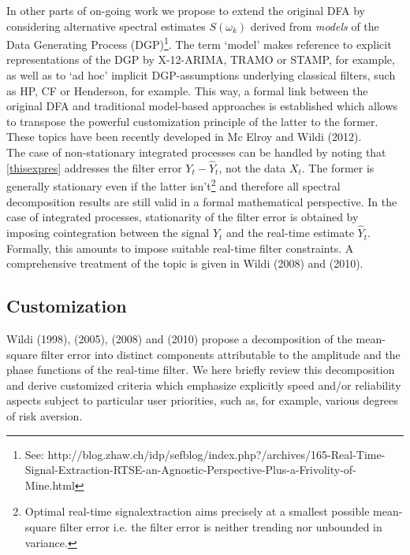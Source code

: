 \documentclass[11pt]{article}
\begin{document}
In other parts of on-going work we propose to extend the original DFA by considering alternative spectral estimates $S(\omega_k)$ derived from \emph{models} of the Data Generating Process (DGP)\footnote{See: http://blog.zhaw.ch/idp/sefblog/index.php?/archives/165-Real-Time-Signal-Extraction-RTSE-an-Agnostic-Perspective-Plus-a-Frivolity-of-Mine.html}. The term `model' makes reference to explicit representations of the DGP by X-12-ARIMA, TRAMO or STAMP, for example, as well as to `ad hoc' implicit DGP-assumptions underlying classical filters, such as HP, CF or Henderson, for example. This way, a formal link between the original DFA and traditional model-based approaches is established which allows to transpose the powerful customization principle of the latter to the former. These topics have been recently developed in Mc Elroy and Wildi (2012). \\


The case of non-stationary integrated processes can be handled by noting that \ref{thisexpres} addresses the filter error $Y_t-\hat{Y}_t$, not the data $X_t$. The former is generally stationary even if the latter isn't\footnote{Optimal real-time signalextraction aims precisely at a smallest possible mean-square filter error i.e. the filter error is neither trending nor unbounded in variance.} and therefore all spectral decomposition results are still valid in a formal mathematical perspective. In the case of integrated processes, stationarity of the filter error is obtained by imposing cointegration between the signal $Y_t$ and the real-time estimate $\hat{Y}_t$. Formally, this amounts to impose suitable real-time filter constraints. A comprehensive treatment of the topic is given in Wildi (2008) and (2010).




\subsection{Customization}\label{speed}

Wildi (1998), (2005), (2008) and (2010) propose a decomposition of the mean-square
filter error into distinct components attributable to the amplitude and the phase functions of the real-time filter. We here briefly review this decomposition and derive customized criteria which emphasize explicitly speed and/or reliability aspects subject to particular user priorities, such as, for example, various degrees of risk aversion.\\
\end{document}
